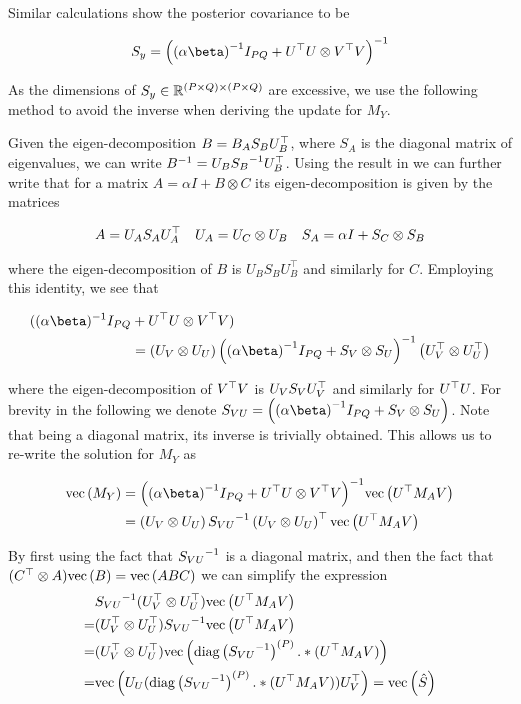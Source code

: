 Similar calculations show the posterior covariance to be 

\begin{align}
S_y = \invb{\invb{\alpha \beta} I_{PQ} + U\T U \otimes V\T V}
\end{align}

As the dimensions of $S_y \in { \mathbb{R}^{(P\times Q) \times (P \times Q)} }$ are excessive, we use the following method to avoid the inverse when deriving the update for $M_Y$.

Given the eigen-decomposition $B = B_A S_B U_B^\top$, where $S_A$ is the diagonal matrix of eigenvalues, we can write ${B}^{-1} = U_B {S_B}^{-1} U_B^\top$. Using the result in \cite{Stegle2011} we can further write that for a matrix $A = \alpha I + B \otimes C$ its eigen-decomposition is given by the matrices

\begin{align}
A & = U_A S_A U_A^\top & U_A & = U_C \otimes U_B & S_A = \alpha I + S_C \otimes S_B
\end{align}

where the eigen-decomposition of $B$ is $U_B S_B U_B^\top$ and similarly for $C$. Employing this identity, we see that

\begin{align}
\begin{split}
((\alpha \beta)^{-1} I_{PQ} & + U\T U \otimes V\T V) \\
& =  \left(U_V \otimes U_U\right)
  \invb{\invb{\alpha \beta} I_{PQ} + S_V \otimes S_U}
  \left(U_V\T \otimes U_U\T\right)
\end{split}
\end{align}

where the eigen-decomposition of $V^\top V$ is $U_V S_V U_V^\top$ and similarly for $U^\top U$. For brevity in the following we denote $S_{VU} = \left(\invb{\alpha \beta} I_{PQ} + S_V \otimes S_U\right)$. Note that being a diagonal matrix, its inverse is trivially obtained. This allows us to re-write the solution for $M_Y$ as

\begin{align}
\vecf{M_Y} 
    & = \invb{\invb{\alpha \beta} I_{PQ} + U\T U \otimes V\T V}\vecf{U\T M_A V} \\
    & = \left(U_V \otimes U_U\right) \inv{S_{VU}} \left(U_V \otimes U_U\right)\T \vecf{U\T M_A V}
\end{align}

By first using the fact that ${S_{VU}}^{-1}$ is a diagonal matrix, and then the fact that $(C^\top \otimes A)\text{vec}\left(B\right) = \text{vec}\left(ABC\right)$ we can simplify the expression 
\begin{align}
 &{S_{VU}}^{-1}(U_V^\top \otimes U_U^\top) \text{vec}\left(U^\top M_A V\right) \\
= & (U_V^\top \otimes U_U^\top){S_{VU}}^{-1} \text{vec}\left(U^\top M_A V\right) \\
= & (U_V^\top \otimes U_U^\top)\text{vec}\left(\text{diag} \left( {{S_{VU}}^{-1}} \right)^{(P)} .* (U^\top M_A V)\right) \\
= & \text{vec}\left(U_U (\text{diag} \left( {{S_{VU}}^{-1}} \right)^{(P)} .* (U^\top M_A V)) U_V^\top\right) = \text{vec}\left(\hat S\right)
\end{align}

